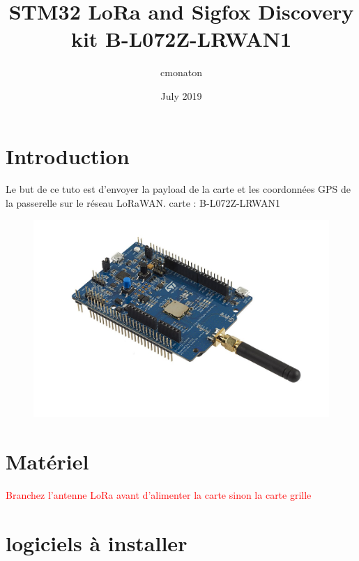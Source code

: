 \documentclass{article}
\title{STM32 LoRa and Sigfox Discovery kit B-L072Z-LRWAN1}
\author{cmonaton }
\date{July 2019}
\begin{document}
\maketitle

\section{Introduction}
Le but de ce tuto est d'envoyer la payload de la carte et les coordonnées GPS de la passerelle sur le réseau LoRaWAN.
carte : B-L072Z-LRWAN1

  \begin{figure}[H]
\begin{center}
\advance\leftskip-3cm
\advance\rightskip-3cm
\includegraphics[keepaspectratio=true,scale=0.5]{carte.jpeg}
\label{visina8}
\end{center}\end{figure}

\section{Matériel}


\textcolor{red}{Branchez l'antenne LoRa avant d'alimenter la carte sinon la carte grille}

\section{logiciels à installer}

\end{document}
